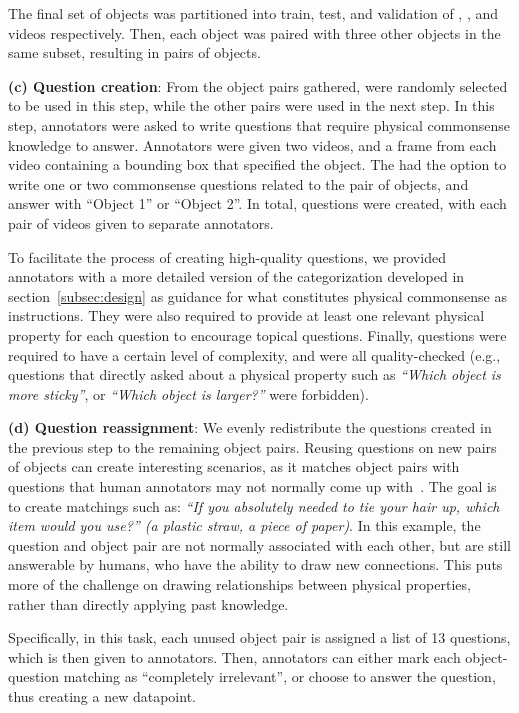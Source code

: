 \documentclass[runningheads]{llncs}
\begin{document}
The final set of  objects was partitioned into train, test, and validation of , , and  videos respectively. Then, each object was paired with three other objects in the same subset, resulting in  pairs of objects. 

\noindent \textbf{(c) Question creation}: From the  object pairs gathered,  were randomly selected to be used in this step, while the other  pairs were used in the next step. In this step, annotators were asked to write questions that require physical commonsense knowledge to answer. Annotators were given two videos, and a frame from each video containing a bounding box that specified the object. The had the option to write one or two commonsense questions related to the pair of objects, and answer with ``Object 1'' or ``Object 2''. In total,  questions were created, with each pair of videos given to  separate annotators. 

To facilitate the process of creating high-quality questions, we provided annotators with a more detailed version of the categorization developed in section~\ref{subsec:design} as guidance for what constitutes physical commonsense as instructions. They were also required to provide at least one relevant physical property
for each question to encourage topical questions. Finally, questions were required to have a certain level of complexity, and were all quality-checked (e.g., questions that directly asked about a physical property such as \textit{``Which object is more sticky''}, or \textit{``Which object is larger?''} were forbidden).

\noindent \textbf{(d) Question reassignment}: We evenly redistribute the  questions created in the previous step to the remaining  object pairs. Reusing questions on new pairs of objects can create interesting scenarios, as it matches object pairs with questions that human annotators may not normally come up with~\cite{bisk2020piqa}. The goal is to create matchings such as: \textit{``If you absolutely needed to tie your hair up, which item would you use?'' (\textcolor{gg}{a plastic straw}, a piece of paper)}. In this example, the question and object pair are not normally associated with each other, but are still answerable by humans, who have the ability to draw new connections. This puts more of the challenge on drawing relationships between physical properties, rather than directly applying past knowledge.

Specifically, in this task, each unused object pair is assigned a list of 13 questions, which is then given to annotators.
Then, annotators can either mark each object-question matching as ``completely irrelevant'', or choose to answer the question, thus creating a new datapoint. 
\end{document}
